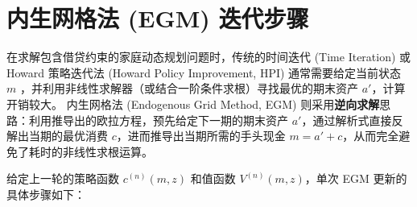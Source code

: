 \documentclass[UTF8,a4paper,12pt]{ctexart}
\begin{document}
\section{内生网格法 (EGM) 迭代步骤}

在求解包含借贷约束的家庭动态规划问题时，传统的时间迭代 (Time Iteration) 或 Howard 策略迭代法 (Howard Policy Improvement, HPI) 通常需要给定当前状态 $m$ ，并利用非线性求解器（或结合一阶条件求根）寻找最优的期末资产 $a'$，计算开销较大。
内生网格法 (Endogenous Grid Method, EGM) 则采用\textbf{逆向求解}思路：利用推导出的欧拉方程，预先给定下一期的期末资产 $a'$，通过解析式直接反解出当期的最优消费 $c$，进而推导出当期所需的手头现金 $m=a'+c$，从而完全避免了耗时的非线性求根运算。

给定上一轮的策略函数 $c^{(n)}(m,z)$ 和值函数 $V^{(n)}(m,z)$，单次 EGM 更新的具体步骤如下：
\end{document}
